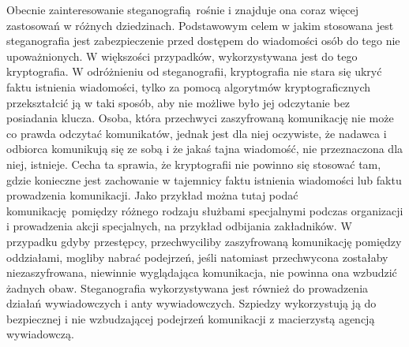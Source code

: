 \documentclass[a4paper, twoside, 12pt]{report}
\begin{document}
        Obecnie zainteresowanie steganografią rośnie i znajduje ona coraz więcej
        zastosowań w różnych dziedzinach. Podstawowym celem w jakim stosowana jest
        steganografia jest zabezpieczenie przed dostępem do wiadomości osób do tego nie
        upoważnionych. W większości przypadków, wykorzystywana jest do tego
        kryptografia. W odróżnieniu od steganografii, kryptografia nie stara się
        ukryć faktu istnienia wiadomości, tylko za pomocą algorytmów kryptograficznych
        przekształcić ją w taki sposób, aby nie możliwe było jej odczytanie bez posiadania
        klucza. Osoba, która przechwyci zaszyfrowaną komunikację nie może co prawda
        odczytać komunikatów, jednak jest dla niej oczywiste, że nadawca i odbiorca
        komunikują się ze sobą i że jakaś tajna wiadomość, nie przeznaczona dla niej,
        istnieje.\cite{DIGITALWATERMARKING} Cecha ta sprawia, że kryptografii nie
        powinno się stosować tam, gdzie konieczne jest zachowanie w tajemnicy
        faktu istnienia wiadomości lub faktu prowadzenia komunikacji. Jako przykład
        można tutaj podać komunikację pomiędzy różnego rodzaju służbami specjalnymi
        podczas organizacji i prowadzenia akcji specjalnych, na przykład odbijania zakładników.
        W przypadku gdyby przestępcy, przechwyciliby zaszyfrowaną komunikację
        pomiędzy oddziałami, mogliby nabrać podejrzeń, jeśli natomiast przechwycona
        zostałaby niezaszyfrowana, niewinnie wyglądająca komunikacja, nie powinna ona
        wzbudzić żadnych obaw. Steganografia wykorzystywana jest również do prowadzenia
        działań wywiadowczych i anty wywiadowczych. Szpiedzy wykorzystują ją do
        bezpiecznej i nie wzbudzającej podejrzeń komunikacji z macierzystą agencją
        wywiadowczą.
\end{document}
